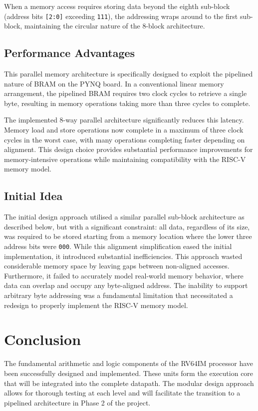 \documentclass{article}
\begin{document}
When a memory access requires storing data beyond the eighth sub-block (address bits \texttt{[2:0]} exceeding \texttt{111}), the addressing wraps around to the first sub-block, maintaining the circular nature of the 8-block architecture.

\subsection*{Performance Advantages}

This parallel memory architecture is specifically designed to exploit the pipelined nature of BRAM on the PYNQ board. In a conventional linear memory arrangement, the pipelined BRAM requires two clock cycles to retrieve a single byte, resulting in memory operations taking more than three cycles to complete.

The implemented 8-way parallel architecture significantly reduces this latency. Memory load and store operations now complete in a maximum of three clock cycles in the worst case, with many operations completing faster depending on alignment. This design choice provides substantial performance improvements for memory-intensive operations while maintaining compatibility with the RISC-V memory model.

\subsection*{Initial Idea}
The initial design approach utilised a similar parallel sub-block architecture as described below, but with a significant constraint: all data, regardless of its size, was required to be stored starting from a memory location where the lower three address bits were \texttt{000}. While this alignment simplification eased the initial implementation, it introduced substantial inefficiencies. This approach wasted considerable memory space by leaving gaps between non-aligned accesses. Furthermore, it failed to accurately model real-world memory behavior, where data can overlap and occupy any byte-aligned address. The inability to support arbitrary byte addressing was a fundamental limitation that necessitated a redesign to properly implement the RISC-V memory model.


\section*{Conclusion}

The fundamental arithmetic and logic components of the RV64IM processor have been successfully designed and implemented. These units form the execution core that will be integrated into the complete datapath. The modular design approach allows for thorough testing at each level and will facilitate the transition to a pipelined architecture in Phase 2 of the project.
\end{document}
